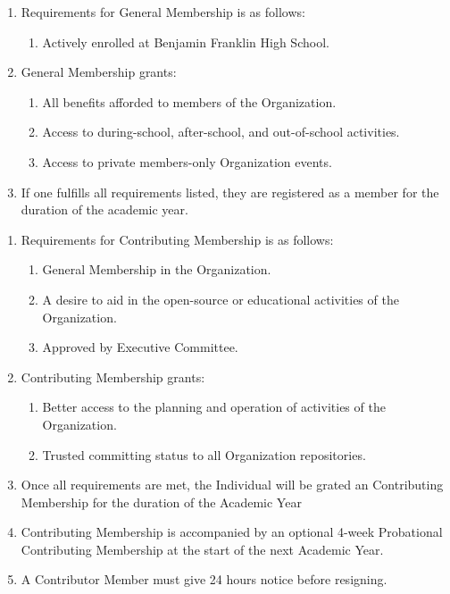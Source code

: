 
\begin{enumerate}
	\item Requirements for General Membership is as follows:
		\begin{enumerate}
			\item Actively enrolled at Benjamin Franklin High School.
		\end{enumerate}

	\item General Membership grants:
		\begin{enumerate}
			\item All benefits afforded to members of the Organization.

			\item Access to during-school, after-school, and out-of-school activities.

			\item Access to private members-only Organization events.
		\end{enumerate}

	\item If one fulfills all requirements listed, they are registered as a member
		for the duration of the academic year.
\end{enumerate}

\begin{enumerate}
	\item Requirements for Contributing Membership is as follows:
		\begin{enumerate}
			\item General Membership in the Organization.

			\item A desire to aid in the open-source or educational activities of the Organization.

			\item Approved by Executive Committee.
		\end{enumerate}

	\item Contributing Membership grants:
		\begin{enumerate}
			\item Better access to the planning and operation of activities of the Organization.

			\item Trusted committing status to all Organization repositories.
		\end{enumerate}

	\item Once all requirements are met, the Individual will be grated an
		Contributing Membership for the duration of the Academic Year

	\item Contributing Membership is accompanied by an optional 4-week Probational
		Contributing Membership at the start of the next Academic Year.

	\item A Contributor Member must give 24 hours notice before resigning.
\end{enumerate}

